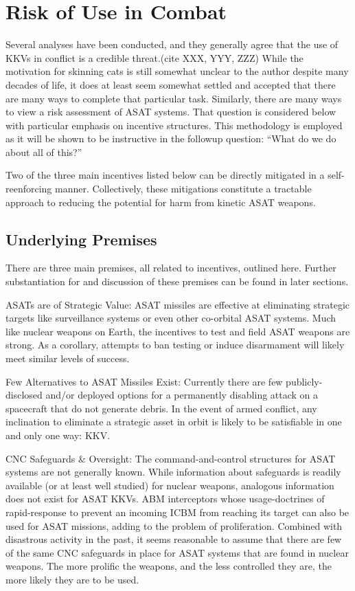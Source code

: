 \section{Risk of Use in Combat}

Several analyses have been conducted, and they generally agree that
the use of KKVs in conflict is a credible threat.(cite XXX, YYY, ZZZ)
While the motivation for skinning cats is still somewhat unclear to
the author despite many decades of life, it does at least seem
somewhat settled and accepted that there are many ways to complete
that particular task.  Similarly, there are many ways to view a risk
assessment of ASAT systems.  That question is considered below with
particular emphasis on incentive structures.  This methodology is
employed as it will be shown to be instructive in the followup
question: ``What do we do about all of this?''

Two of the three main incentives listed below can be directly
mitigated in a self-reenforcing manner.  Collectively, these
mitigations constitute a tractable approach to reducing the potential
for harm from kinetic ASAT weapons.

\subsection{Underlying Premises}

There are three main premises, all related to incentives, outlined
here.  Further substantiation for and discussion of these premises can
be found in later sections.

ASATs are of Strategic Value: ASAT missiles are effective at
eliminating strategic targets like surveillance systems or even other
co-orbital ASAT systems.  Much like nuclear weapons on Earth, the
incentives to test and field ASAT weapons are strong.  As a corollary,
attempts to ban testing or induce disarmament will likely meet similar
levels of success.

Few Alternatives to ASAT Missiles Exist: Currently there are few
publicly-disclosed and/or deployed options for a permanently disabling
attack on a spacecraft that do not generate debris.  In the event of
armed conflict, any inclination to eliminate a strategic asset in
orbit is likely to be satisfiable in one and only one way: KKV.

CNC Safeguards \& Oversight: The command-and-control structures for
ASAT systems are not generally known.  While information about
safeguards is readily available (or at least well studied) for nuclear
weapons, analogous information does not exist for ASAT KKVs.  ABM
interceptors whose usage-doctrines of rapid-response to prevent an
incoming ICBM from reaching its target can also be used for ASAT
missions, adding to the problem of proliferation.  Combined with
disastrous activity in the past, it seems reasonable to assume that
there are few of the same CNC safeguards in place for ASAT systems
that are found in nuclear weapons.  The more prolific the weapons, and
the less controlled they are, the more likely they are to be used.

